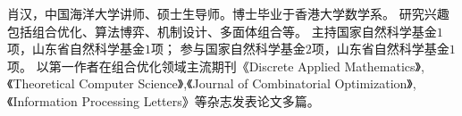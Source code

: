 %
%

\par{
肖汉，中国海洋大学讲师、硕士生导师。博士毕业于香港大学数学系。
研究兴趣包括组合优化、算法博弈、机制设计、多面体组合等。
主持国家自然科学基金$1$项，山东省自然科学基金$1$项；
参与国家自然科学基金$2$项，山东省自然科学基金$1$项。
以第一作者在组合优化领域主流期刊《Discrete Applied Mathematics》,《Theoretical Computer Science》,《Journal of Combinatorial Optimization》,《Information Processing Letters》等杂志发表论文多篇。
}
